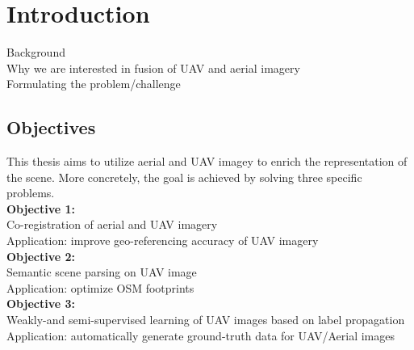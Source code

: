 \chapter{Introduction}
\label{ch:intro}
Background\\
Why we are interested in fusion of UAV and aerial imagery\\
Formulating the problem/challenge\\
\section{Objectives}
This thesis aims to utilize aerial and UAV imagey to enrich the representation of the scene. More concretely, the goal is achieved by solving three specific problems.\\

\textbf{Objective 1:}\\
Co-registration of aerial and UAV imagery\\
Application: improve geo-referencing accuracy of UAV imagery\\

\textbf{Objective 2:}\\
Semantic scene parsing on UAV image\\
Application: optimize OSM footprints\\

\textbf{Objective 3:}\\
Weakly-and semi-supervised learning of UAV images based on label propagation\\
Application: automatically generate ground-truth data for UAV/Aerial images